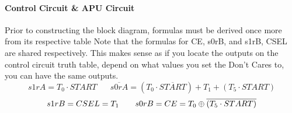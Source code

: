 \documentclass[11pt,a4paper,english]{article}
\begin{document}
\pagebreak
  \paragraph*{Control Circuit \& APU Circuit} Prior to constructing the block diagram, formulas must be derived once more from its respective table Note that the formulas for CE, s0rB, and s1rB, CSEL are shared respectively. This makes sense as if you locate the outputs on the control circuit truth table, depend on what values you set the Don't Cares to, you can have the same outputs.
  \begin{equation}
    s1rA = T_0 \cdot START \hspace{20pt} \overline{s0rA} = (T_0 \cdot \overline{START}) + T_1 + (T_5 \cdot START)
  \end{equation}
  \begin{equation}
    s1rB = CSEL = T_1 \hspace*{20pt} s0rB = CE = T_0 \oplus \overline{(T_5 \cdot START)}
  \end{equation}
\end{document}
